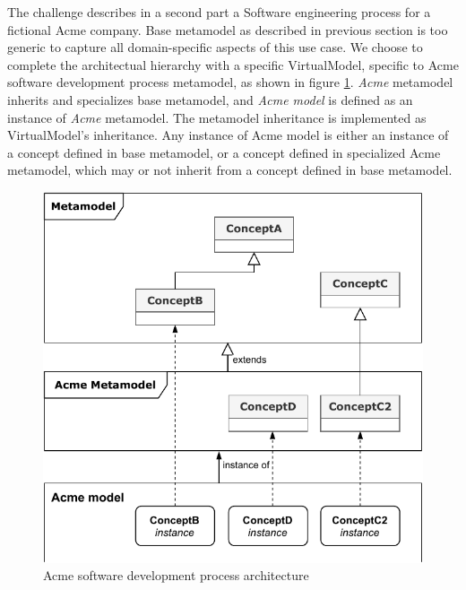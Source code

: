 The challenge describes in a second part a Software engineering process for a fictional Acme company. Base metamodel as described in previous section is too generic to capture all domain-specific aspects of this use case. We choose to complete the architectual hierarchy with a specific VirtualModel, specific to Acme software development process metamodel, as shown in figure \ref{fig:AcmeArchitecture}. \textit{Acme} metamodel inherits and specializes base metamodel, and \textit{Acme model} is defined as an instance of \textit{Acme} metamodel. The metamodel inheritance is implemented as VirtualModel's inheritance. Any instance of Acme model is either an instance of a concept defined in base metamodel, or a concept defined in specialized Acme metamodel, which may or not inherit from a concept defined in base metamodel.

\begin{figure}
 \centering
    \includegraphics[width=1.0 \columnwidth]{Figures/AcmeArchitecture.pdf}
     \caption{Acme software development process architecture}
    \label{fig:AcmeArchitecture}
\end{figure}

